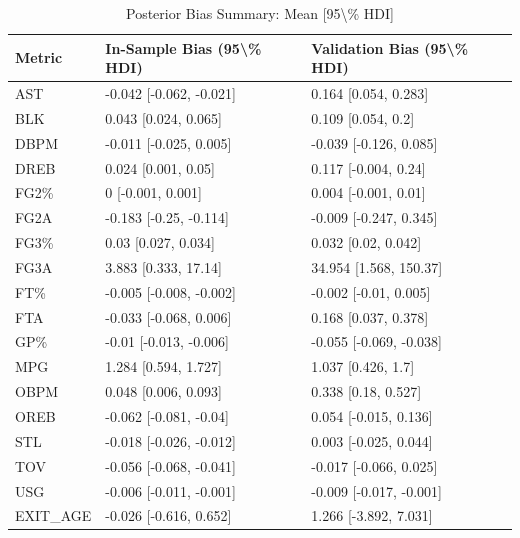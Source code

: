 \begin{table}[t]
\caption*{
{\fontsize{20}{25}\selectfont  Posterior Bias Summary: Mean [95\textbackslash{}\% HDI]\fontsize{12}{15}\selectfont }
} 
\fontsize{12.0pt}{14.0pt}\selectfont
\begin{tabular*}{\linewidth}{@{\extracolsep{\fill}}lll}
\toprule
Metric & In-Sample Bias (95\textbackslash{}\% HDI) & Validation Bias (95\textbackslash{}\% HDI) \\ 
\midrule\addlinespace[2.5pt]
AST & -0.042 [-0.062, -0.021] & 0.164 [0.054, 0.283] \\ 
BLK & 0.043 [0.024, 0.065] & 0.109 [0.054, 0.2] \\ 
DBPM & -0.011 [-0.025, 0.005] & -0.039 [-0.126, 0.085] \\ 
DREB & 0.024 [0.001, 0.05] & 0.117 [-0.004, 0.24] \\ 
FG2\% & 0 [-0.001, 0.001] & 0.004 [-0.001, 0.01] \\ 
FG2A & -0.183 [-0.25, -0.114] & -0.009 [-0.247, 0.345] \\ 
FG3\% & 0.03 [0.027, 0.034] & 0.032 [0.02, 0.042] \\ 
FG3A & 3.883 [0.333, 17.14] & 34.954 [1.568, 150.37] \\ 
FT\% & -0.005 [-0.008, -0.002] & -0.002 [-0.01, 0.005] \\ 
FTA & -0.033 [-0.068, 0.006] & 0.168 [0.037, 0.378] \\ 
GP\% & -0.01 [-0.013, -0.006] & -0.055 [-0.069, -0.038] \\ 
MPG & 1.284 [0.594, 1.727] & 1.037 [0.426, 1.7] \\ 
OBPM & 0.048 [0.006, 0.093] & 0.338 [0.18, 0.527] \\ 
OREB & -0.062 [-0.081, -0.04] & 0.054 [-0.015, 0.136] \\ 
STL & -0.018 [-0.026, -0.012] & 0.003 [-0.025, 0.044] \\ 
TOV & -0.056 [-0.068, -0.041] & -0.017 [-0.066, 0.025] \\ 
USG & -0.006 [-0.011, -0.001] & -0.009 [-0.017, -0.001] \\ 
EXIT\_AGE & -0.026 [-0.616, 0.652] & 1.266 [-3.892, 7.031] \\ 
\bottomrule
\end{tabular*}
\end{table}

